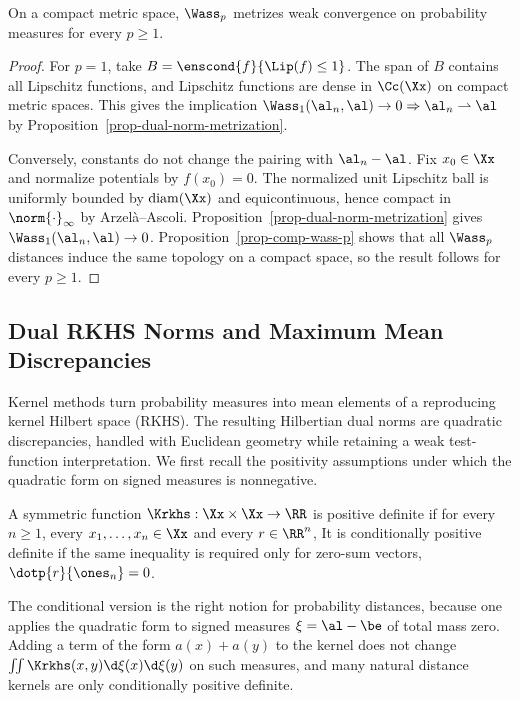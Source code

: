 \begin{cor}\label{cor-topol-wass}
	On a compact metric space, $\Wass_p$ metrizes weak convergence on probability measures for every $p\geq1$.
\end{cor}
\begin{proof}
	For $p=1$, take $B=\enscond{f}{\Lip(f)\leq1}$. The span of $B$ contains all Lipschitz functions, and Lipschitz functions are dense in $\Cc(\Xx)$ on compact metric spaces. This gives the implication $\Wass_1(\al_n,\al)\to0\Rightarrow \al_n\rightharpoonup\al$ by Proposition~\ref{prop-dual-norm-metrization}.

	Conversely, constants do not change the pairing with $\al_n-\al$. Fix $x_0\in\Xx$ and normalize potentials by $f(x_0)=0$. The normalized unit Lipschitz ball is uniformly bounded by $\mathrm{diam}(\Xx)$ and equicontinuous, hence compact in $\norm{\cdot}_\infty$ by Arzel\`a--Ascoli. Proposition~\ref{prop-dual-norm-metrization} gives $\Wass_1(\al_n,\al)\to0$. Proposition~\ref{prop-comp-wass-p} shows that all $\Wass_p$ distances induce the same topology on a compact space, so the result follows for every $p\geq1$.
\end{proof}

\subsection{Dual RKHS Norms and Maximum Mean Discrepancies}
\label{sec-rkhs-mmd}

Kernel methods turn probability measures into mean elements of a reproducing kernel Hilbert space (RKHS). The resulting Hilbertian dual norms are quadratic discrepancies, handled with Euclidean geometry while retaining a weak test-function interpretation. We first recall the positivity assumptions under which the quadratic form on signed measures is nonnegative.

\begin{defn}\label{def-positive-kernels}
	A symmetric function $\Krkhs:\Xx\times\Xx\to\RR$ is positive definite if for every $n\geq1$, every $x_1,\ldots,x_n\in\Xx$ and every $r\in\RR^n$,
	It is conditionally positive definite if the same inequality is required only for zero-sum vectors, $\dotp{r}{\ones_n}=0$.
\end{defn}

The conditional version is the right notion for probability distances, because one applies the quadratic form to signed measures $\xi=\al-\be$ of total mass zero. Adding a term of the form $a(x)+a(y)$ to the kernel does not change $\iint \Krkhs(x,y)\d\xi(x)\d\xi(y)$ on such measures, and many natural distance kernels are only conditionally positive definite.


